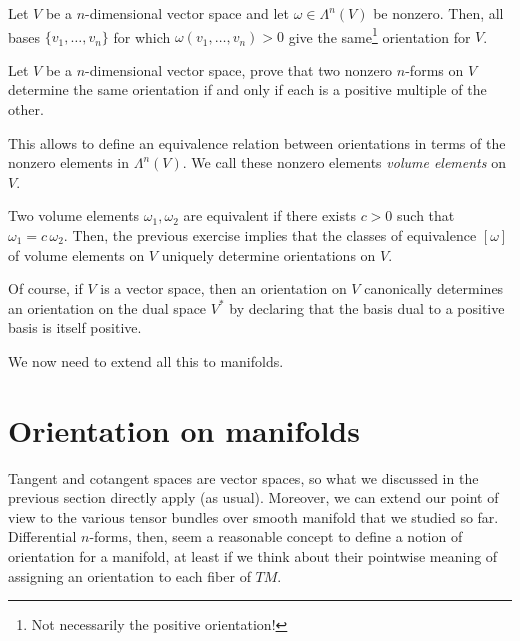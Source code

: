 \begin{lemma}\label{lemma:orient}
	Let $V$ be a $n$-dimensional vector space and let $\omega\in\Lambda^n(V)$ be nonzero.
	Then, all bases $\{v_1, \ldots, v_n\}$ for which $\omega(v_1,\ldots, v_n) > 0$ give the same\footnote{Not necessarily the positive orientation!} orientation for $V$.
\end{lemma}

\begin{exercise}
	Let $V$ be a $n$-dimensional vector space, prove that two nonzero $n$-forms on $V$ determine the same orientation if and only if each is a positive multiple of the other.
\end{exercise}

This allows to define an equivalence relation between orientations in terms of the nonzero elements in $\Lambda^n(V)$. We call these nonzero elements \emph{volume elements} on $V$.

Two volume elements $\omega_1, \omega_2$ are equivalent if there exists $c > 0$ such that $\omega_1 = c\, \omega_2$.
Then, the previous exercise implies that the classes of equivalence $[\omega]$ of volume elements on $V$ uniquely determine orientations on $V$.

\begin{remark}
	Of course, if $V$ is a vector space, then an orientation on $V$ canonically determines an orientation on the dual space $V^*$ by declaring that the basis dual to a positive basis is itself positive.
\end{remark}

We now need to extend all this to manifolds.

\section{Orientation on manifolds}
Tangent and cotangent spaces are vector spaces, so what we discussed in the previous section directly apply (as usual).
Moreover, we can extend our point of view to the various tensor bundles over smooth manifold that we studied so far.
Differential $n$-forms, then, seem a reasonable concept to define a notion of orientation for a manifold, at least if we think about their pointwise meaning of assigning an orientation to each fiber of $TM$.

